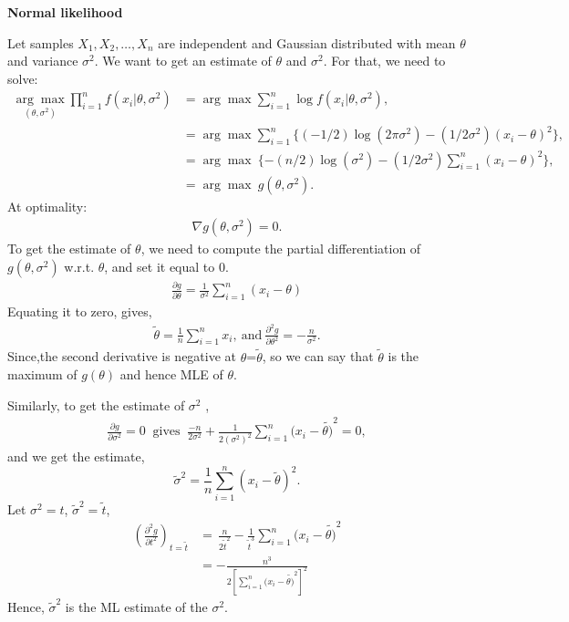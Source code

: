\begin{exmp}\textbf{Normal likelihood}
\par Let samples $X_1,X_2,\dots,X_n$ are independent and Gaussian distributed with mean $\theta$ and variance $\sigma^2$. We want to get an estimate of $\theta$ and $\sigma^2$. For that, we need to solve:
\begin{align}
\underset{(\theta,\sigma^2)}{\arg\max}
\prod\limits_{i=1}^n f(x_i|\theta,\sigma^2)&= \arg\max\sum\limits_{i=1}^n \log f(x_i|\theta,\sigma^2),\\
&=\arg\max \sum\limits_{i=1}^n\{(-1/2)\log(2\pi\sigma^2)-(1/2\sigma^2)(x_i-\theta)^2\},\nonumber\\
&=\arg\max~\{-(n/2)\log(\sigma^2)-(1/2\sigma^2)\sum\limits_{i=1}^n(x_i-\theta)^2\},\nonumber\\
&=\arg\max~g(\theta,\sigma^2).
\end{align}
At optimality: 
\begin{align}
\nabla{g}(\theta,\sigma^2)=0.
\end{align} 
To get the estimate of $\theta$, we need to compute the partial differentiation of ${g}(\theta,\sigma^2)$ w.r.t. $\theta$, and set it equal to $0$. 
\begin{align}
\frac{\partial g}{\partial \theta}=\frac{1}{\sigma^2}\sum\limits_{i=1}^n(x_i-\theta)
\end{align}
Equating it to zero, gives,
\begin{align}
\tilde{\theta}=\frac{1}{n}\sum\limits_{i=1}^n x_i,~\mbox{and}~
\frac{\partial^2 g}{\partial \theta^2}=-\frac{n}{\sigma^2}.
\end{align}
Since,the second derivative is negative at $\theta$=$\tilde{\theta}$, so we can say that
 $\tilde{\theta}$ is the maximum of $g(\theta)$ and hence MLE of $\theta$.
\par Similarly, to get the estimate of $\sigma^2$ ,
\begin{align}
\frac{\partial g}{\partial \sigma^2}=0~\mbox{ gives }~\frac{-n}{2\sigma^2}+\frac{1}{2(\sigma^2)^2}\sum\limits_{i=1}^n(x_i-\tilde{\theta)}^2=0,
\end{align}
and we get the estimate,
\begin{equation}
\tilde{\sigma}^2=\frac{1}{n}\sum\limits_{i=1}^n(x_i-\tilde{\theta})^2.
\end{equation}
Let $\sigma^2=t$, $\tilde{\sigma}^2=\tilde{t}$,
\begin{align}
{\left(\frac{\partial^2 g}{\partial t^2}\right)}_{t=\tilde{t}}&=\, \frac{n}{2\tilde{t}^2}-\frac{1}{\tilde{t}^3}\sum\limits_{i=1}^n(x_i-\tilde{\theta)}^2\\
&=-\frac{n^3}{2\left[\sum\limits_{i=1}^n(x_i-\tilde{\theta)}^2\right]^2}
\end{align}
Hence, $\tilde{\sigma}^2$ is the ML estimate of the $\sigma^2$.
\end{exmp}
